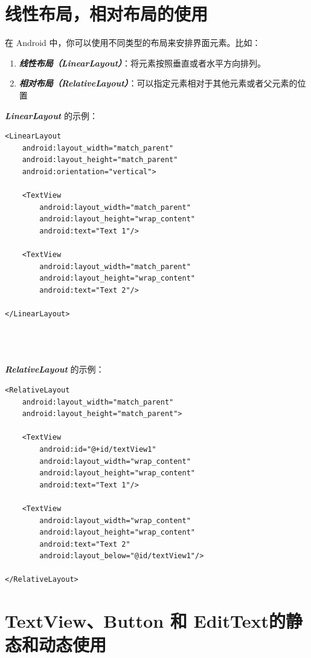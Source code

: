 \documentclass[12pt, a4paper, oneside]{ctexbook}
\numberwithin{figure}{section}
\begin{document}
\section{线性布局，相对布局的使用}
在 Android 中，你可以使用不同类型的布局来安排界面元素。比如：
\begin{enumerate}
    \item \textbf{\textit{线性布局（LinearLayout）}}：将元素按照垂直或者水平方向排列。
    \item \textbf{\textit{相对布局（RelativeLayout）}}：可以指定元素相对于其他元素或者父元素的位置
\end{enumerate}

\textbf{\textit{LinearLayout}} 的示例：
\begin{verbatim}
<LinearLayout
    android:layout_width="match_parent"
    android:layout_height="match_parent"
    android:orientation="vertical">

    <TextView
        android:layout_width="match_parent"
        android:layout_height="wrap_content"
        android:text="Text 1"/>

    <TextView
        android:layout_width="match_parent"
        android:layout_height="wrap_content"
        android:text="Text 2"/>

</LinearLayout>




\end{verbatim}

\textbf{\textit{RelativeLayout}} 的示例：
\begin{verbatim}
<RelativeLayout
    android:layout_width="match_parent"
    android:layout_height="match_parent">

    <TextView
        android:id="@+id/textView1"
        android:layout_width="wrap_content"
        android:layout_height="wrap_content"
        android:text="Text 1"/>

    <TextView
        android:layout_width="wrap_content"
        android:layout_height="wrap_content"
        android:text="Text 2"
        android:layout_below="@id/textView1"/>

</RelativeLayout>

\end{verbatim}
\section{TextView、Button 和 EditText的静态和动态使用}
\end{document}
